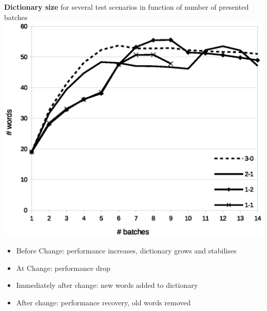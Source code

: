 \documentclass[a0,sans]{esatposter}
\begin{document}
{{\begin{minipage}{\linewidth}
\centering
\large
\textbf{Dictionary size} for several test scenarios in function of number of presented batches\\
\includegraphics[width=0.8\linewidth]{OrdEng.eps}
\end{minipage}

\large{
\begin{itemize}
\item Before Change: performance increases, dictionary grows and stabilises
\item At Change: performance drop
\item Immediately after change: new words added to dictionary
\item After change:  performance recovery, old words removed
\end{itemize}
}


	}\vbs
	
}
\end{document}
